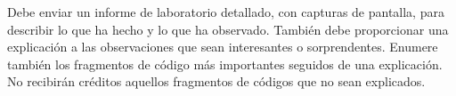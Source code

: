 
Debe enviar un informe de laboratorio detallado, con capturas de pantalla, para describir lo que ha hecho y lo que ha observado.
También debe proporcionar una explicación a las observaciones que sean interesantes o sorprendentes.
Enumere también los fragmentos de código más importantes seguidos de una explicación. No recibirán créditos aquellos fragmentos de códigos que no sean explicados.